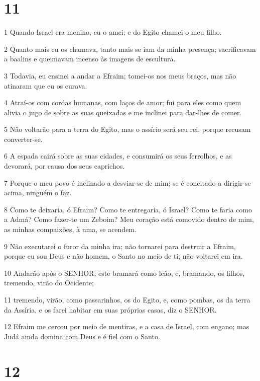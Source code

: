 \chapter{11}

\par 1 Quando Israel era menino, eu o amei; e do Egito chamei o meu filho.
\par 2 Quanto mais eu os chamava, tanto mais se iam da minha presença; sacrificavam a baalins e queimavam incenso às imagens de escultura.
\par 3 Todavia, eu ensinei a andar a Efraim; tomei-os nos meus braços, mas não atinaram que eu os curava.
\par 4 Atraí-os com cordas humanas, com laços de amor; fui para eles como quem alivia o jugo de sobre as suas queixadas e me inclinei para dar-lhes de comer.
\par 5 Não voltarão para a terra do Egito, mas o assírio será seu rei, porque recusam converter-se.
\par 6 A espada cairá sobre as suas cidades, e consumirá os seus ferrolhos, e as devorará, por causa dos seus caprichos.
\par 7 Porque o meu povo é inclinado a desviar-se de mim; se é concitado a dirigir-se acima, ninguém o faz.
\par 8 Como te deixaria, ó Efraim? Como te entregaria, ó Israel? Como te faria como a Admá? Como fazer-te um Zeboim? Meu coração está comovido dentro de mim, as minhas compaixões, à uma, se acendem.
\par 9 Não executarei o furor da minha ira; não tornarei para destruir a Efraim, porque eu sou Deus e não homem, o Santo no meio de ti; não voltarei em ira.
\par 10 Andarão após o SENHOR; este bramará como leão, e, bramando, os filhos, tremendo, virão do Ocidente;
\par 11 tremendo, virão, como passarinhos, os do Egito, e, como pombas, os da terra da Assíria, e os farei habitar em suas próprias casas, diz o SENHOR.
\par 12 Efraim me cercou por meio de mentiras, e a casa de Israel, com engano; mas Judá ainda domina com Deus e é fiel com o Santo.

\chapter{12}

